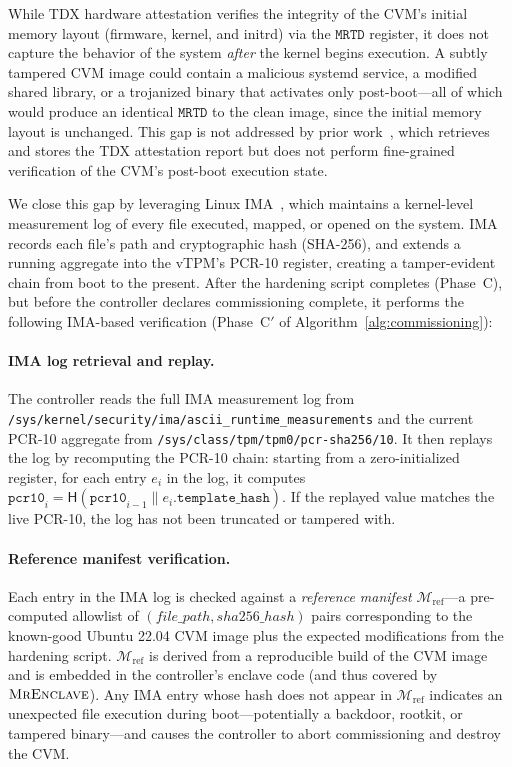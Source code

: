 While TDX hardware attestation verifies the integrity of the CVM's
initial memory layout (firmware, kernel, and initrd) via the
$\texttt{MRTD}$ register, it does not capture the behavior of the
system \emph{after} the kernel begins execution.  A subtly
tampered CVM image could contain a malicious systemd service, a
modified shared library, or a trojanized binary that activates only
post-boot---all of which would produce an identical $\texttt{MRTD}$
to the clean image, since the initial memory layout is unchanged.
This gap is not addressed by prior work~\cite{akkus2024duet}, which
retrieves and stores the TDX attestation report but does not perform
fine-grained verification of the CVM's post-boot execution state.

We close this gap by leveraging Linux IMA~\cite{sailer2004ima}, which
maintains a kernel-level measurement log of every file executed,
mapped, or opened on the system.  IMA records each file's path and
cryptographic hash (SHA-256), and extends a running aggregate into
the vTPM's PCR-10 register, creating a tamper-evident chain from
boot to the present.  After the hardening script completes
(Phase~C), but before the controller declares commissioning
complete, it performs the following IMA-based verification
(Phase~C$'$ of Algorithm~\ref{alg:commissioning}):

\paragraph{IMA log retrieval and replay.}
The controller reads the full IMA measurement log from
\texttt{/sys/kernel/security/ima/ascii\_runtime\_measurements}
and the current PCR-10 aggregate from
\texttt{/sys/class/tpm/tpm0/pcr-sha256/10}.  It then replays the
log by recomputing the PCR-10 chain: starting from a zero-initialized
register, for each entry $e_i$ in the log, it computes
$\texttt{pcr10}_{i} = \textsf{H}(\texttt{pcr10}_{i-1} \| e_i.\texttt{template\_hash})$.
If the replayed value matches the live PCR-10, the log has not been
truncated or tampered with.

\paragraph{Reference manifest verification.}
Each entry in the IMA log is checked against a \emph{reference
manifest} $\mathcal{M}_{\text{ref}}$---a pre-computed allowlist of
$(file\_path, sha256\_hash)$ pairs corresponding to the known-good
Ubuntu 22.04 CVM image plus the expected modifications from the
hardening script.  $\mathcal{M}_{\text{ref}}$ is derived from a
reproducible build of the CVM image and is embedded in the
controller's enclave code (and thus covered by
$\textsc{MrEnclave}$).  Any IMA entry whose hash does not appear in
$\mathcal{M}_{\text{ref}}$ indicates an unexpected file execution
during boot---potentially a backdoor, rootkit, or tampered
binary---and causes the controller to abort commissioning and destroy
the CVM.

